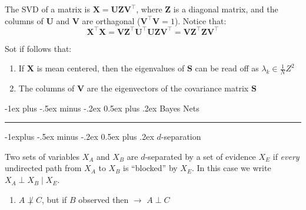 \documentclass[10pt,landscape]{article}
\makeatletter
\renewcommand{\section}{\@startsection{section}{1}{0mm}%
                                {-1ex plus -.5ex minus -.2ex}%
                                {0.5ex plus .2ex}%
                                {\normalfont\large\bfseries}}
\renewcommand{\subsection}{\@startsection{subsection}{2}{0mm}%
                                {-1explus -.5ex minus -.2ex}%
                                {0.5ex plus .2ex}%
                                {\normalfont\normalsize\bfseries}}
\makeatother
\begin{document}
\begin{multicols*}{3}
	The SVD of a matrix is $\mathbf{X} = \mathbf{UZV}^{\top}$, where $\mathbf{Z}$ is a diagonal matrix, and the columns of $\mathbf{U}$ and $\mathbf{V}$ are orthagonal ($\mathbf{V}^\top\mathbf{V} = 1$). Notice that:
	$$\mathbf{X}^{\top}\mathbf{X} = \mathbf{V} \mathbf{Z}^{\top} \mathbf{U}^{\top} \mathbf{U} \mathbf{Z} \mathbf{V}^{\top} = \mathbf{V} \mathbf{Z}^{\top}\mathbf{Z} \mathbf{V}^{\top}$$

	Sot if follows that:
	\begin{enumerate}
		\item If $\mathbf{X}$ is mean centered, then the eigenvalues of $\mathbf{S}$ can be read off as $\lambda_{k} \in \frac{1}{N} Z^{2}$

		\item The columns of $\mathbf{V}$ are the eigenvectors of the covariance matrix $\mathbf{S}$
	\end{enumerate}
	\section{Bayes Nets}\smallskip \hrule height 2pt \smallskip

	\subsection{$d$-separation}
	\begin{minipage}{\linewidth}
		\centering
	\end{minipage} \vspace{-0.25 cm}

	Two sets of variables $X_A$ and $X_B$ are $d$-separated by a set of evidence $X_E$ if \emph{every} undirected path from $X_A$ to $X_B$ is ``blocked'' by $X_E$. In this case we write $X_A \perp X_B \mid X_E$.
	\begin{enumerate}
		\item $A \not \perp C$, but if $B$ observed then $\rightarrow$ $A \perp C$

		      \smallskip


\end{enumerate}
\end{multicols*}
\end{document}
